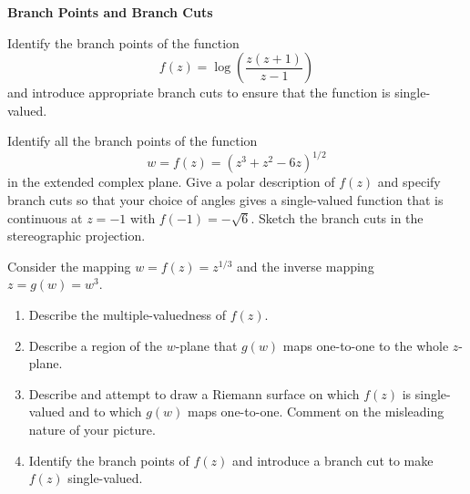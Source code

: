 {\begin{Exercise}
\end{Exercise}











\begin{large}
  \noindent
  \textbf{Branch Points and Branch Cuts}
\end{large}





\begin{Exercise}
  \label{exercise log zz+1z-1}
  Identify the branch points of the function
  \[
  f(z) = \log \left( \frac{ z (z+1) }{ z-1 } \right)
  \]
  and introduce appropriate branch cuts to ensure that the function is 
  single-valued.

\end{Exercise}





\begin{Exercise}
  \label{exercise z3 z2 6z 12}
  Identify all the branch points of the function
  \[
  w = f(z) = \left( z^3 + z^2 - 6 z \right)^{1/2}
  \]
  in the extended complex plane.  Give a polar description of $f(z)$ and 
  specify branch cuts so that your choice of angles gives a single-valued
  function that is continuous at $z = -1$ with $f(-1) = - \sqrt{6}$.
  Sketch the branch cuts in the stereographic projection.

\end{Exercise}








\begin{Exercise}
  \label{exercise mapping z13}
  Consider the mapping $w = f(z) = z^{1/3}$ and the inverse mapping 
  $z = g(w) = w^3$.
  \begin{enumerate}
  \item 
    Describe the multiple-valuedness of $f(z)$.
  \item
    Describe a region of the $w$-plane that $g(w)$ maps one-to-one to the whole
    $z$-plane.
  \item
    Describe and attempt to draw a Riemann surface on which $f(z)$ is 
    single-valued and to which $g(w)$ maps one-to-one.  Comment on the 
    misleading nature of your picture.
  \item
    Identify the branch points of $f(z)$ and introduce a branch cut to make 
    $f(z)$ single-valued.
  \end{enumerate}


\end{Exercise}}
